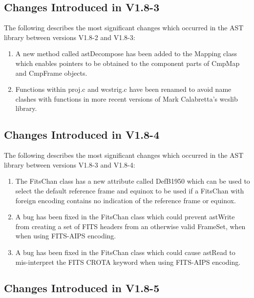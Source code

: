 \documentclass[twoside,11pt]{article}
\begin{document}
\subsection{Changes Introduced in V1.8-3}

The following describes the most significant changes which
occurred in the AST library between versions V1.8-2 and V1.8-3:

\begin{enumerate}

\item A new method called astDecompose has been added to the Mapping class
which enables pointers to be obtained to the component parts of CmpMap and 
CmpFrame objects.

\item Functions within proj.c and wcstrig.c have been renamed to avoid name 
clashes with functions in more recent versions of Mark Calabretta's wcslib 
library.

\end{enumerate}

\subsection{Changes Introduced in V1.8-4}

The following describes the most significant changes which
occurred in the AST library between versions V1.8-3 and V1.8-4:

\begin{enumerate}

\item The FitsChan class has a new attribute called DefB1950 which can be 
used to select the default reference frame and equinox to be used if
a FitsChan with foreign encoding contains no indication of the
reference frame or equinox.

\item A bug has been fixed in the FitsChan class which could prevent
astWrite from creating a set of FITS headers from an otherwise valid
FrameSet, when when using FITS-AIPS encoding.

\item A bug has been fixed in the FitsChan class which could cause
astRead to mis-interpret the FITS CROTA keyword when using FITS-AIPS 
encoding.

\end{enumerate}

\subsection{Changes Introduced in V1.8-5}
\end{document}
